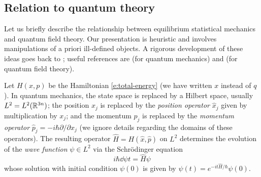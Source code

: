 

\subsection{Relation to quantum theory}
\label{sec:quantum}

Let us briefly describe the relationship between equilibrium statistical
mechanics and quantum field theory. Our presentation is heuristic and involves
manipulations of a priori ill-defined objects. A rigorous development of these
ideas goes back to \cite{Syma69,Nelson73,OS73,OS75}; useful references are
\cite{Simon05} (for quantum mechanics) and \cite{GJ87} (for quantum
field theory).

Let $H(x, p)$ be the Hamiltonian \eqref{e:total-energy} (we have written $x$
instead of $q$). In quantum mechanics, the state space is replaced by a Hilbert
space, usually $L^2 = L^2({\mathbb R}^{3n})$;
the position $x_j$ is replaced by the \emph{position operator} $\hat x_j$ given by
multiplication by $x_j$; and the momentum $p_j$ is replaced by the \emph{momentum
operator} $\hat p_j = -i \hbar \partial/\partial x_j$ (we ignore details regarding
the domains of these operators). The resulting operator $\hat H = H(\hat x, \hat p)$
on $L^2$ determines the evolution of the \emph{wave function} $\psi\in L^2$ via
the Schr\"{o}dinger equation
\begin{equation}
i\hbar \dd{\psi}{t} = \hat H \psi
\end{equation}
whose solution with initial condition $\psi(0)$ is given by
$\psi(t) = e^{-it\hat H/\hbar} \psi(0)$.

